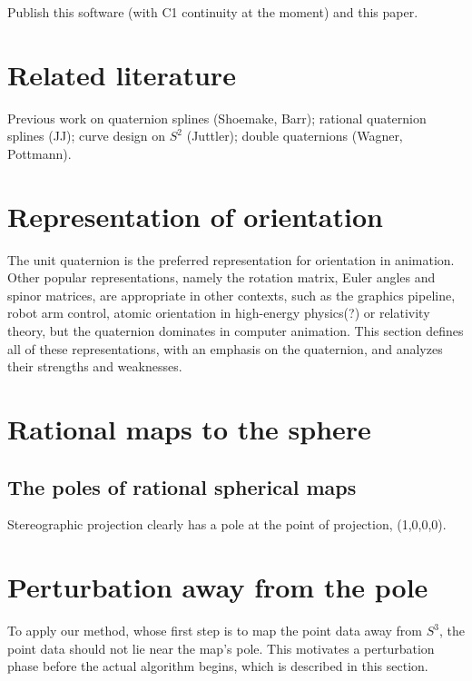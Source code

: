 \documentclass[12pt]{article}
\begin{document}
Publish this software (with C1 continuity at the moment) and this paper.

\section{Related literature}

Previous work on quaternion splines (Shoemake, Barr); rational quaternion splines (JJ);
curve design on $S^2$ (Juttler); double quaternions (Wagner, Pottmann).

\section{Representation of orientation}

The unit quaternion is the preferred representation for orientation in animation.
Other popular representations, namely the rotation matrix, Euler angles and 
spinor matrices, are appropriate in other contexts, such as the graphics pipeline, 
robot arm control, atomic orientation in high-energy physics(?) or relativity theory,
but the quaternion dominates in computer animation.
This section defines all of these representations, with an emphasis on the quaternion,
and analyzes their strengths and weaknesses.

\section{Rational maps to the sphere}

\subsection{The poles of rational spherical maps}

Stereographic projection clearly has a pole at the point of projection, (1,0,0,0).

\section{Perturbation away from the pole}

To apply our method, whose first step is to map the point data away from $S^3$, 
the point data should not lie near the map's pole.
This motivates a perturbation phase before the actual algorithm begins,
which is described in this section.
\end{document}
